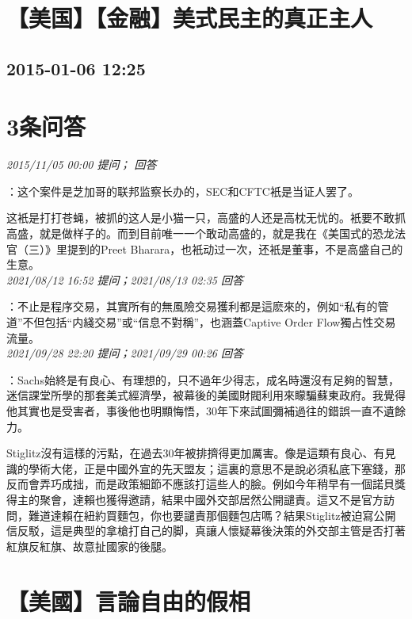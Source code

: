 \documentclass[twocolumn]{ctexart}
\begin{document}
\section{【美国】【金融】美式民主的真正主人}
\subsection{2015-01-06 12:25}


\section{3条问答}

\textit{\hfill\noindent\small 2015/11/05 00:00 提问； 回答}

：这个案件是芝加哥的联邦监察长办的，SEC和CFTC衹是当证人罢了。

这衹是打打苍蝇，被抓的这人是小猫一只，高盛的人还是高枕无忧的。衹要不敢抓高盛，就是做样子的。而到目前唯一一个敢动高盛的，就是我在《美国式的恐龙法官（三）》里提到的Preet Bharara，也衹动过一次，还衹是董事，不是高盛自己的生意。\\

\textit{\hfill\noindent\small 2021/08/12 16:52 提问；2021/08/13 02:35 回答}

：不止是程序交易，其實所有的無風險交易獲利都是這麽來的，例如“私有的管道”不但包括“内綫交易”或“信息不對稱”，也涵蓋Captive Order Flow獨占性交易流量。
\\

\textit{\hfill\noindent\small 2021/09/28 22:20 提问；2021/09/29 00:26 回答}

：Sachs始終是有良心、有理想的，只不過年少得志，成名時還沒有足夠的智慧，迷信課堂所學的那套美式經濟學，被幕後的美國財閥利用來矇騙蘇東政府。我覺得他其實也是受害者，事後他也明顯悔悟，30年下來試圖彌補過往的錯誤一直不遺餘力。

Stiglitz沒有這樣的污點，在過去30年被排擠得更加厲害。像是這類有良心、有見識的學術大佬，正是中國外宣的先天盟友；這裏的意思不是說必須私底下塞錢，那反而會弄巧成拙，而是政策細節不應該打這些人的臉。例如今年稍早有一個諾貝獎得主的聚會，達賴也獲得邀請，結果中國外交部居然公開譴責。這又不是官方訪問，難道達賴在紐約買麵包，你也要譴責那個麵包店嗎？結果Stiglitz被迫寫公開信反駁，這是典型的拿槍打自己的脚，真讓人懷疑幕後決策的外交部主管是否打著紅旗反紅旗、故意扯國家的後腿。
\\


\section{【美國】言論自由的假相}
\end{document}
